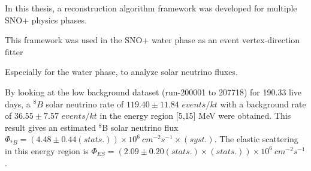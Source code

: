 In this thesis, a reconstruction algorithm framework was developed for multiple SNO+ physics phases. 

This framework was used in the SNO+ water phase as an event vertex-direction fitter 

Especially for the water phase, to analyze solar neutrino fluxes.

By looking at the low background dataset (run-200001 to 207718) for 190.33 live days, a $^8B$ solar neutrino rate of $119.40\pm11.84$ $events/kt$ with a background rate of $36.55\pm7.57$ $events/kt$ in the energy region [5,15] MeV were obtained. This result gives an estimated $^8$B solar neutrino flux $\Phi_{^8B}=(4.48 \pm 0.44(stats.))\times10^6~cm^{-2}s^{-1}\times(syst.)$. The elastic scattering in this energy region is $\Phi_{ES}=(2.09 \pm 0.20(stats.)\times(stats.))\times10^6~cm^{-2}s^{-1}$.